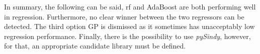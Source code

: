 In summary, the following can be said, \gls{rf} and AdaBoost are both performing well in regression. Furthermore, no clear winner between the two regressors can be detected. 
The third option GP is dismissed as it sometimes has unacceptably low regression performance. 
Finally, there is the possibility to use \emph{pySindy}, however, for that, an appropriate candidate library must be defined.
\FloatBarrier